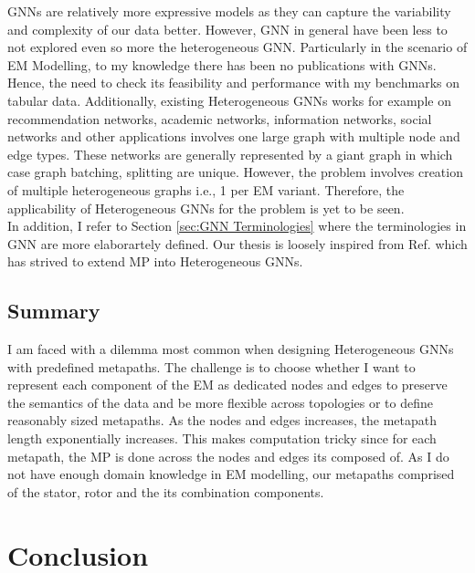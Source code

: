 \documentclass{report} %
\begin{document}
\ac{GNN}s are relatively more expressive models as they can capture the variability and complexity of our data better.
However, \ac{GNN} in general have been less to not explored even so more the heterogeneous \ac{GNN}.
Particularly in the scenario of \ac{EM} Modelling, to my knowledge there has been no publications with \ac{GNN}s.
Hence, the need to check its feasibility and performance with my benchmarks on tabular data.
Additionally, existing Heterogeneous \ac{GNN}s works for example on recommendation networks, academic networks, information networks, social networks and other applications 
involves one large graph with multiple node and edge types. These networks are generally represented by a giant graph in which case graph batching, splitting are unique. 
However, the problem involves creation of multiple heterogeneous graphs i.e., 1 per \ac{EM} variant. Therefore, the applicability of Heterogeneous \ac{GNN}s for the 
problem is yet to be seen.\\

In addition, I refer to Section \ref{sec:GNN Terminologies} where the terminologies in \ac{GNN} are more elaborartely defined.
Our thesis is loosely inspired from Ref. \cite{ML HGNN-2023} which has strived to extend \ac{MP} into Heterogeneous \ac{GNN}s.

\section{Summary}\label{sec:EM Heterogeneous GNN Discussion}
I am faced with a dilemma most common when designing Heterogeneous \ac{GNN}s with predefined metapaths.
The challenge is to choose whether I want to represent each component of the \ac{EM} as dedicated nodes and edges to preserve the semantics of the data and be more flexible 
across topologies or to define reasonably sized metapaths. As the nodes and edges increases, the metapath length exponentially increases.
This makes computation tricky since for each metapath, the \ac{MP} is done across the nodes and edges its composed of.
As I do not have enough domain knowledge in \ac{EM} modelling, our metapaths comprised of the stator, rotor and the its combination components.
\chapter{Conclusion}
\end{document}
